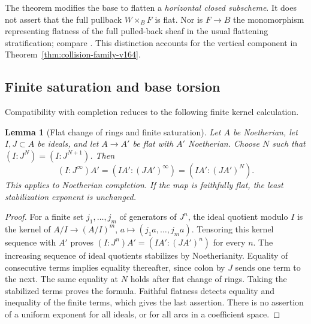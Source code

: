 \documentclass[11pt,reqno]{amsart}
\numberwithin{equation}{section}
\newtheorem{lemma}[theorem]{Lemma}
\theoremstyle{definition}\newtheorem{definition}[theorem]{Definition}
\theoremstyle{remark}\newtheorem{remark}[theorem]{Remark}
\begin{document}
The theorem modifies the base to flatten a \emph{horizontal closed
subscheme}. It does not assert that the full pullback $W\times_B F$
is flat. Nor is $F\to B$ the monomorphism representing flatness of
the full pulled-back sheaf in the usual flattening stratification;
compare \cite[Tag 05PS]{Stacks166}. This distinction accounts for
the vertical component in Theorem~\ref{thm:collision-family-v164}.

\subsection{Finite saturation and base torsion}
Compatibility with completion reduces to the following finite kernel calculation.
\begin{lemma}[Flat change of rings and finite saturation]
\label{lem:saturation-v166}
Let $A$ be Noetherian, let $I,J\subset A$ be ideals, and let $A\to A'$
be flat with $A'$ Noetherian. Choose $N$ such that
$(I:J^N)=(I:J^{N+1})$. Then
\begin{equation}\label{eq:saturation-flat-v166}
 (I:J^\infty)A'=(IA':(JA')^\infty)
              =(IA':(JA')^N).
\end{equation}
This applies to Noetherian completion. If the map is faithfully flat,
the least stabilization exponent is unchanged.
\end{lemma}
\begin{proof}
For a finite set $j_1,\ldots,j_m$ of generators of $J^n$, the ideal
quotient modulo $I$ is the kernel of
$A/I\to(A/I)^m$, $a\mapsto(j_1a,\ldots,j_ma)$. Tensoring this
kernel sequence with $A'$ proves
$(I:J^n)A'=(IA':(JA')^n)$ for every $n$. The increasing sequence of
ideal quotients stabilizes by Noetherianity. Equality of consecutive
terms implies equality thereafter, since colon by $J$ sends one
term to the next. The same equality at $N$ holds after flat change
of rings. Taking the stabilized terms proves the formula. Faithful
flatness detects equality and inequality of the finite terms,
which gives the last assertion. There is no assertion of a uniform
exponent for all ideals, or for all arcs in a coefficient space.
\end{proof}
\end{document}

